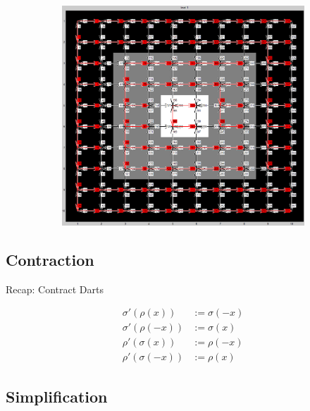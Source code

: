 \documentclass[12pt]{article}
\newif\ifdebug
\newcommand{\todo}[1]{\ifdebug \textcolor{red}{\textit{\textbf{TODO:}} #1}\else \fi}    %
\begin{document}
\begin{figure}[tb]
\begin{subfigure}[t]{0.3\textwidth}
      \caption{}\label{fig:dart_contract3}
    \end{subfigure}
    ~
    \begin{subfigure}[t]{0.3\textwidth}
      \includegraphics[width=\textwidth]{img/contract1.jpg}
      \caption{}\label{fig:dart_contract1}
    \end{subfigure}
  \caption{\todo{caption}}\label{fig:dart_contract}
\end{figure}


\subsection{Contraction} %
\label{sub:contraction}

Recap: Contract Darts

\begin{align}
  \sigma'(\rho(x))   &:= \sigma(-x)    \\
  \sigma'(\rho(-x))  &:= \sigma(x)     \\
  \rho'(\sigma(x))   &:= \rho(-x) \\
  \rho'(\sigma(-x))  &:= \rho(x)
\end{align}


\subsection{Simplification} %
\label{sub:simplification}
\end{document}
